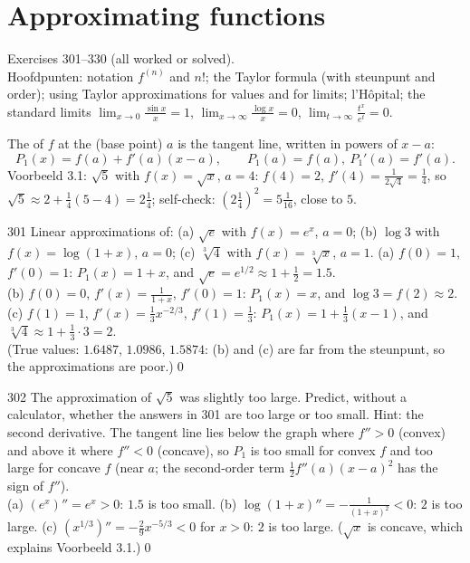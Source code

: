 \chapter{Approximating functions}
%
{Exercises 301--330 (all worked or solved).\\ Hoofdpunten: notation $f^{(n)}$ and $n!$; the Taylor formula (with steunpunt and order); using Taylor approximations for values and for limits; l'H\^opital; the standard limits $\lim_{x\to0}\frac{\sin x}x=1$, $\lim_{x\to\infty}\frac{\log x}x=0$, $\lim_{t\to\infty}\frac{t^x}{e^t}=0$.}

\begin{key}
The  of $f$ at the  (base point) $a$ is the tangent line, written in powers of $x-a$:
\[
P_1(x)=f(a)+f'(a)(x-a),\qquad P_1(a)=f(a),\ P_1'(a)=f'(a).
\]
Voorbeeld 3.1: $\sqrt5$ with $f(x)=\sqrt x$, $a=4$: $f(4)=2$, $f'(4)=\frac1{2\sqrt4}=\frac14$, so $\sqrt5\approx2+\frac14(5-4)=2\frac14$; self-check: $(2\frac14)^2=5\frac1{16}$, close to $5$.
\end{key}

\begin{bookex}{301}
Linear approximations of: (a) $\sqrt e$ with $f(x)=e^x$, $a=0$; (b) $\log3$ with $f(x)=\log(1+x)$, $a=0$; (c) $\sqrt[3]4$ with $f(x)=\sqrt[3]x$, $a=1$.
\solution
(a) $f(0)=1$, $f'(0)=1$: $P_1(x)=1+x$, and $\sqrt e=e^{1/2}\approx1+\frac12=1.5$.\\
(b) $f(0)=0$, $f'(x)=\frac1{1+x}$, $f'(0)=1$: $P_1(x)=x$, and $\log3=f(2)\approx2$.\\
(c) $f(1)=1$, $f'(x)=\frac13x^{-2/3}$, $f'(1)=\frac13$: $P_1(x)=1+\frac13(x-1)$, and $\sqrt[3]4\approx1+\frac13\cdot3=2$.\\
(True values: $1.6487$, $1.0986$, $1.5874$: (b) and (c) are far from the steunpunt, so the approximations are poor.)\qed
\end{bookex}

\begin{bookex}{302}
The approximation of $\sqrt5$ was slightly too large. Predict, without a calculator, whether the answers in 301 are too large or too small. Hint: the second derivative.
\solution
The tangent line lies below the graph where $f''>0$ (convex) and above it where $f''<0$ (concave), so $P_1$ is too small for convex $f$ and too large for concave $f$ (near $a$; the second-order term $\frac12f''(a)(x-a)^2$ has the sign of $f''$).\\
(a) $(e^x)''=e^x>0$: $1.5$ is too small. (b) $\log(1+x)''=-\frac1{(1+x)^2}<0$: $2$ is too large. (c) $(x^{1/3})''=-\frac29x^{-5/3}<0$ for $x>0$: $2$ is too large. ($\sqrt x$ is concave, which explains Voorbeeld 3.1.)\qed
\end{bookex}

